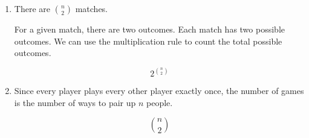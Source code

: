 \begin{enumerate}[label=(\alph*)]
\item There are ${n \choose 2}$ matches. 

For a given match, there are two outcomes. Each match has two possible outcomes. We can use the multiplication rule to count the total possible outcomes.

  $$ 2^{{n \choose 2}} $$

\item Since every player plays every other player exactly once, the number of games is the number of ways to pair up $n$ people.

  $$ {n \choose 2} $$
\end{enumerate}